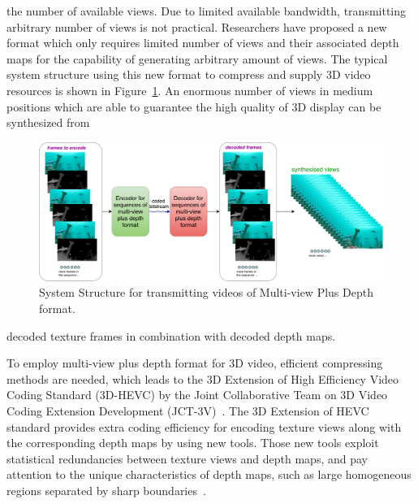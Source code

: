the number of available views.
Due to limited available bandwidth, transmitting arbitrary number of views
is not practical.
Researchers have proposed a new format which only requires limited number
of views and their associated depth maps for the capability of
generating arbitrary amount of views.
The typical system structure using this new format to compress and supply 3D video
resources is shown in Figure~\ref{fig:SS-MVD}.
An enormous number of views in medium positions which are able to
guarantee the high quality of 3D display can be synthesized from
\begin{figure}[!b]
    \centering
    \includegraphics[width=\textwidth,height=\textheight,keepaspectratio]{Figures/SystemStructureOf3DEncoder}
    \caption[System Structure for transmitting videos of Multi-view 
    Plus Depth format]{System Structure for transmitting videos of 
    Multi-view Plus Depth format.}\label{fig:SS-MVD}
\end{figure}
decoded texture frames in combination with decoded depth maps.

To employ multi-view plus depth format for 3D video, efficient compressing
methods are needed, which leads to the 3D Extension of
High Efficiency Video Coding Standard (3D-HEVC) by the Joint Collaborative Team
on 3D Video Coding Extension Development (JCT-3V)~\parencite{RN195}.
The 3D Extension of HEVC standard provides extra coding efficiency
for encoding texture views along with the corresponding depth maps by
using new tools. 
Those new tools exploit statistical redundancies between
texture views and depth maps, and pay attention to the unique characteristics of
depth maps, such as large homogeneous
regions separated by sharp boundaries~\parencite{RN47}.

